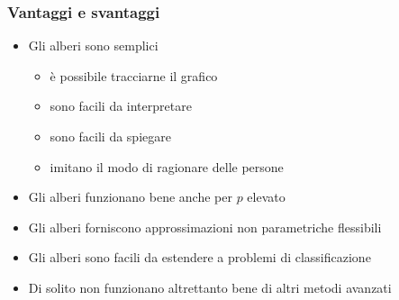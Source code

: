 \begin{frame}
	\frametitle{Vantaggi e svantaggi}
	
	\begin{itemize}
		\item [\bb{+}] Gli alberi sono semplici
			\begin{itemize}
				\item è possibile tracciarne il grafico
				\item sono facili da interpretare
				\item sono facili da spiegare
				\item imitano il modo di ragionare delle persone
			\end{itemize}
		\item [\bb{+}] Gli alberi funzionano bene anche per $p$ elevato
		\item [\bb{+}] Gli alberi forniscono approssimazioni non parametriche flessibili
		\item [\bb{+}] Gli alberi sono facili da estendere a problemi di classificazione
	\end{itemize}
	
	\begin{itemize}
	
		\item [\bb{\mbox{$-$}}] Di solito non funzionano altrettanto bene di altri metodi avanzati
	\end{itemize}
\end{frame}


